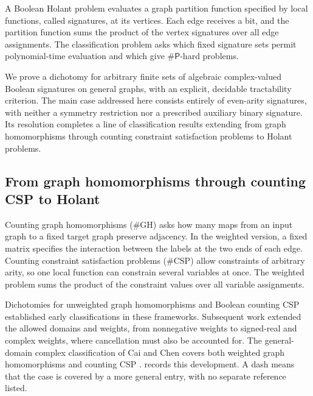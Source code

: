 \documentclass[11pt,letterpaper,onecolumn]{article}
\theoremstyle{plain}
\theoremstyle{definition}
\theoremstyle{remark}
\newcommand{\SharpP}{\#\mathsf P}
\begin{document}
A Boolean Holant problem evaluates a graph partition function specified by
local functions, called signatures, at its vertices.  Each edge receives a
bit, and the partition function sums the product of the vertex signatures
over all edge assignments.  The classification problem asks which fixed
signature sets permit polynomial-time evaluation and which give
\(\SharpP\)-hard problems.

We prove a dichotomy for arbitrary finite sets of algebraic complex-valued
Boolean signatures on general graphs, with an explicit, decidable
tractability criterion.  The main case addressed here consists entirely of
even-arity signatures, with neither a symmetry restriction nor a prescribed
auxiliary binary signature.  Its resolution completes a line of
classification results extending from graph homomorphisms through counting
constraint satisfaction problems to Holant problems.

\subsection{From graph homomorphisms through counting CSP to Holant}
\label{subsec:intro-history}

Counting graph homomorphisms (\(\#\mathrm{GH}\)) asks how many maps from an
input graph to a fixed target graph preserve adjacency.  In the weighted
version, a fixed matrix specifies the interaction between the labels at
the two ends of each edge.  Counting constraint satisfaction problems
(\(\#\mathrm{CSP}\)) allow constraints of arbitrary arity, so one local
function can constrain several variables at once.  The weighted problem
sums the product of the constraint values over all variable assignments.

Dichotomies for unweighted graph homomorphisms and Boolean counting CSP
\cite{DyerGreenhill2000,CreignouHermann1996} established early classifications
in these frameworks.  Subsequent work extended the allowed domains and
weights, from nonnegative weights to signed-real and complex weights,
where cancellation must also be accounted for.  The general-domain complex
classification of Cai and Chen covers both weighted graph homomorphisms
and counting CSP \cite{CaiChen2017}.
 records this development.  A dash means that
the case is covered by a more general entry, with no separate reference
listed.
\end{document}
